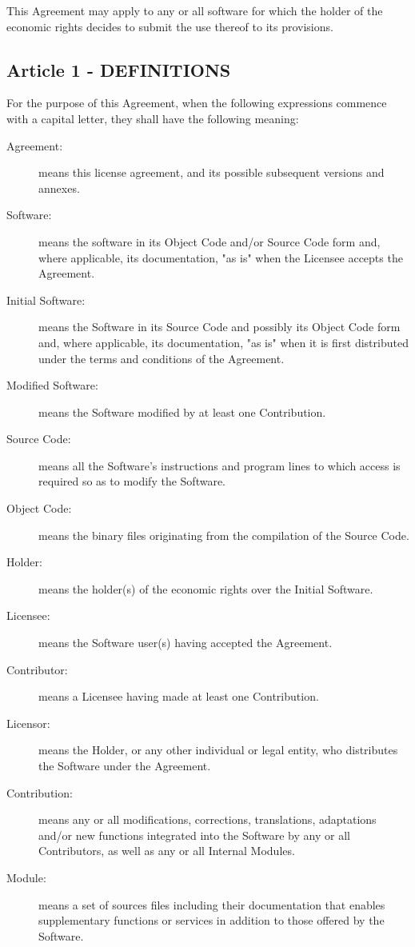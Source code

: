 This Agreement may apply to any or all software for which the holder of the economic rights decides to submit the use thereof to its provisions.

\subsection*{Article 1 - DEFINITIONS}

For the purpose of this Agreement, when the following expressions commence with a capital letter, they shall have the following meaning:
\begin{description}
\item[Agreement:] means this license agreement, and its possible subsequent versions and annexes.
\item[Software:] means the software in its Object Code and/or Source Code form and, where applicable, its documentation, "as is" when the Licensee accepts the Agreement.
\item[Initial Software:] means the Software in its Source Code and possibly its Object Code form and, where applicable, its documentation, "as is" when it is first distributed under the terms and conditions of the Agreement.\
\item[Modified Software:] means the Software modified by at least one Contribution.
\item[Source Code:] means all the Software's instructions and program lines to which access is required so as to modify the Software.
\item[Object Code:] means the binary files originating from the compilation of the Source Code.
\item[Holder:] means the holder(s) of the economic rights over the Initial Software.
\item[Licensee:] means the Software user(s) having accepted the Agreement.
\item[Contributor:] means a Licensee having made at least one Contribution.
\item[Licensor:] means the Holder, or any other individual or legal entity, who distributes the Software under the Agreement.
\item[Contribution:] means any or all modifications, corrections, translations, adaptations and/or new functions integrated into the Software by any or all Contributors, as well as any or all Internal Modules.
\item[Module:] means a set of sources files including their documentation that enables supplementary functions or services in addition to those offered by the Software.

\end{description}
